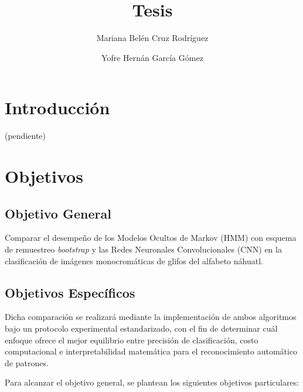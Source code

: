 \documentclass[
  spanish,
  us-letterpaper,
  DIV=11,
  numbers=noendperiod]{scrreprt}
\title{Tesis}
\author{Mariana Belén Cruz Rodríguez \and Yofre Hernán García Gómez}
\date{}
\renewcommand*\contentsname{Tabla de contenidos}
\newcommand\contentsname{Tabla de contenidos}
\begin{document}
\maketitle

\renewcommand*\contentsname{Tabla de contenidos}
{
\hypersetup{linkcolor=}
\setcounter{tocdepth}{2}
\tableofcontents
}


\chapter{Introducción}\label{introducciuxf3n}

(pendiente)


\chapter{Objetivos}\label{objetivos}

\section{Objetivo General}\label{objetivo-general}

Comparar el desempeño de los Modelos Ocultos de Markov (HMM) con esquema
de remuestreo \emph{bootstrap} y las Redes Neuronales Convolucionales
(CNN) en la clasificación de imágenes monocromáticas de glifos del
alfabeto náhuatl.

\section{Objetivos Específicos}\label{objetivos-especuxedficos}

Dicha comparación se realizará mediante la implementación de ambos
algoritmos bajo un protocolo experimental estandarizado, con el fin de
determinar cuál enfoque ofrece el mejor equilibrio entre precisión de
clasificación, costo computacional e interpretabilidad matemática para
el reconocimiento automático de patrones.

Para alcanzar el objetivo general, se plantean los siguientes objetivos
particulares:
\end{document}
